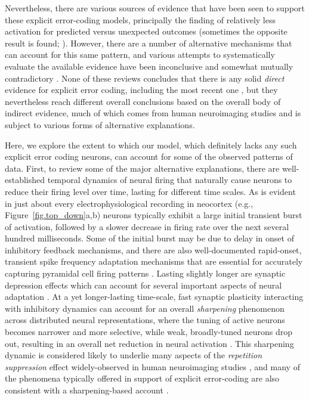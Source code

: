 \documentclass[11pt,twoside]{article}
\newif\myifpdf
\begin{document}
Nevertheless, there are various sources of evidence that have been seen to support these explicit error-coding models, principally the finding of relatively less activation for predicted versus unexpected outcomes \cite[e.g.,]{SummerfieldTrittschuhMontiEtAl08,TodorovicEdeMarisEtAl11,MeyerOlson11,BastosUsreyAdamsEtAl12} (sometimes the opposite result is found; ).  However, there are a number of alternative mechanisms that can account for this same pattern, and various attempts to systematically evaluate the available evidence have been inconclusive and somewhat mutually contradictory \cite{KokLange15,KokJeheedeLange12,SummerfieldEgner09,LeeMumford03}.  None of these reviews concludes that there is any solid {\em direct} evidence for explicit error coding, including the most recent one \cite{KokLange15}, but they nevertheless reach different overall conclusions based on the overall body of indirect evidence, much of which comes from human neuroimaging studies and is subject to various forms of alternative explanations.

Here, we explore the extent to which our model, which definitely lacks any such explicit error coding neurons, can account for some of the observed patterns of data.  First, to review some of the major alternative explanations, there are well-established temporal dynamics of neural firing that naturally cause neurons to reduce their firing level over time, lasting for different time scales.  As is evident in just about every electrophysiological recording in neocortex (e.g., Figure~\ref{fig.top_down}a,b) neurons typically exhibit a large initial transient burst of activation, followed by a slower decrease in firing rate over the next several hundred milliseconds.  Some of the initial burst may be due to delay in onset of inhibitory feedback mechanisms, and there are also well-documented rapid-onset, transient spike frequency adaptation mechanisms that are essential for accurately capturing pyramidal cell firing patterns \cite{BretteGerstner05,GerstnerNaud09}.  Lasting slightly longer are synaptic depression effects \cite{MarkramTsodyks96,AbbottVarelaSenEtAl97,Hennig13} which can account for several important aspects of neural adaptation \cite{MullerMethaKrauskopfEtAl99}.  At a yet longer-lasting time-scale, fast synaptic plasticity interacting with inhibitory dynamics can account for an overall {\em sharpening} phenomenon across distributed neural representations, where the tuning of active neurons becomes narrower and more selective, while weak, broadly-tuned neurons drop out, resulting in an overall net reduction in neural activation \cite{Desimone96,WiggsMartin98,NormanOReilly03}.  This sharpening dynamic is considered likely to underlie many aspects of the {\em repetition suppression} effect widely-observed in human neuroimaging studies \cite{Grill-SpectorHensonMartin06}, and many of the phenomena typically offered in support of explicit error-coding are also consistent with a sharpening-based account \cite{KokJeheedeLange12,LeeMumford03}.
\end{document}
